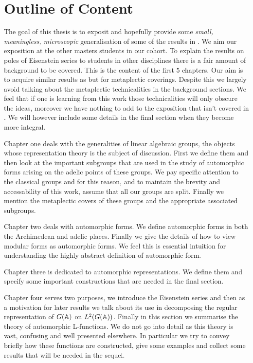 \section*{Outline of Content}
The goal of this thesis is to exposit and hopefully provide some \textit{small, meaningless, microscopic} generalisation of some of the results in \cite{jiangPolesCertainResidual2013}. We aim our exposition at the other masters students in our cohort.
To explain the results on poles of Eisenstein series to students in other disciplines there is a fair amount of background to be covered. This is the content of the first 5 chapters. Our aim is to acquire similar results as \cite{jiangPolesCertainResidual2013} but for metaplectic coverings. Despite this we largely avoid talking about the metaplectic technicalities in the background sections. We feel that if one is learning from this work those technicalities will only obscure the ideas, moreover we have nothing to add to the exposition that isn't covered in \cite{moeglinSpectralDecompositionEisenstein1995}. We will however include some details in the final section when they become more integral. 

Chapter one deals with the generalities of linear algebraic groups, the objects whose representation theory is the subject of discussion. First we define them and then look at the important subgroups that are used in the study of automorphic forms arising on the adelic points of these groups. We pay specific attention to the classical groups and for this reason, and to maintain the brevity and accessability of this work, assume that all our groups are split. Finally we mention the metaplectic covers of these groups and the appropriate associated subgroups. 

Chapter two deals with automorphic forms. We define automorphic forms in both the Archimedean and adelic places. Finally we give the details of how to view modular forms as automorphic forms. We feel this is essential intuition for understanding the highly abstract definition of automorphic form. 

Chapter three is dedicated to automorphic representations. We define them and specify some important constructions that are needed in the final section.

Chapter four serves two purposes, we introduce the Eisenstein series and then as a motivation for later results we talk about its use in decomposing the regular representation of \(G(\A)\) on \(L^2(G(\A))\). Finally in this section we summarise the theory of automorphic L-functions. We do not go into detail as this theory is vast, confusing and well presented elsewhere. In particular we try to convey briefly how these functions are constructed, give some examples and collect some results that will be needed in the sequel. 

